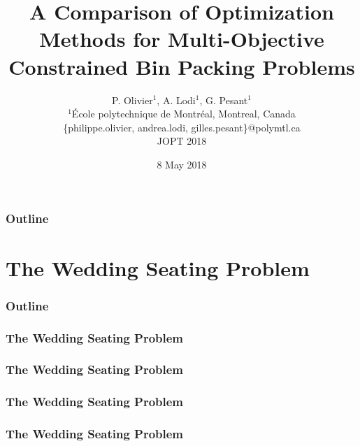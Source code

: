 \documentclass{beamer}
\title[Comparison of Optimization Methods]{A Comparison of Optimization Methods for Multi-Objective Constrained Bin Packing Problems}
\author[P. Olivier, A. Lodi, G. Pesant] {
  P. Olivier$^1$, A. Lodi$^1$, G. Pesant$^1$ \\
  \vspace{0.5cm}
  \scriptsize $^1$École polytechnique de Montréal, Montreal, Canada \\
  \{philippe.olivier, andrea.lodi, gilles.pesant\}@polymtl.ca \\
  \vspace{1cm}
  \normalsize JOPT 2018
}
\date[JOPT 2018]{8 May 2018}
\newcommand{\AutoSectionTitle}{}
\begin{document}
\begin{frame}
  \titlepage
\end{frame}

\begin{frame}
  \frametitle{Outline}
  \tableofcontents
\end{frame}




\renewcommand{\AutoSectionTitle}{The Wedding Seating Problem}

\section{\AutoSectionTitle}

\begin{frame}
  \frametitle{Outline}
  \tableofcontents[currentsection]
\end{frame}




\begin{frame}
  \frametitle{\AutoSectionTitle}
  \begin{center}
    
  \end{center}
\end{frame}




\begin{frame}
  \frametitle{\AutoSectionTitle}
  \begin{center}
    
  \end{center}
\end{frame}




\begin{frame}
  \frametitle{\AutoSectionTitle}
  \begin{center}
    
  \end{center}
\end{frame}




\begin{frame}
  \frametitle{\AutoSectionTitle}
  \begin{center}
    
  \end{center}
\end{frame}
\end{document}
